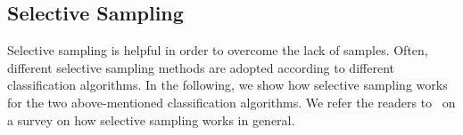 



\subsection{Selective Sampling} \label{subsec:active:learning}
Selective sampling is helpful in order to overcome the lack of samples. Often, different selective sampling methods are adopted according to different classification algorithms. In the following, we show how selective sampling works for the two above-mentioned classification algorithms. We refer the readers to~\cite{???} on a survey on how selective sampling works in general.

